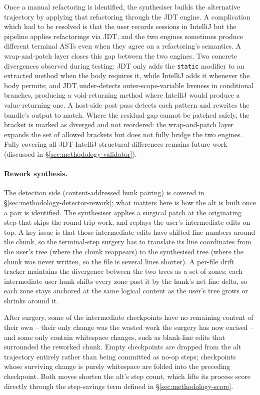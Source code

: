 Once a manual refactoring is identified, the synthesiser builds the alternative trajectory by applying that refactoring through the JDT engine. A complication which had to be resolved is that the user records sessions in IntelliJ but the pipeline applies refactorings via JDT, and the two engines sometimes produce different terminal ASTs even when they agree on a refactoring's semantics. A wrap-and-patch layer closes this gap between the two engines. Two concrete divergences observed during testing: JDT only adds the \texttt{static} modifier to an extracted method when the body requires it, while IntelliJ adds it whenever the body permits; and JDT under-detects outer-scope-variable liveness in conditional branches, producing a void-returning method where IntelliJ would produce a value-returning one. A host-side post-pass detects each pattern and rewrites the bundle's output to match. Where the residual gap cannot be patched safely, the bracket is marked as diverged and not reordered: the wrap-and-patch layer expands the set of allowed brackets but does not fully bridge the two engines. Fully covering all JDT-IntelliJ structural differences remains future work (discussed in \S\ref{sec:methodology-validator}).

\paragraph{Rework synthesis.}
The detection side (content-addressed hunk pairing) is covered in \S\ref{sec:methodology-detector-rework}; what matters here is how the alt is built once a pair is identified. The synthesiser applies a surgical patch at the originating step that skips the round-trip work, and replays the user's intermediate edits on top. A key issue is that those intermediate edits have shifted line numbers around the chunk, so the terminal-step surgery has to translate its line coordinates from the user's tree (where the chunk reappears) to the synthesised tree (where the chunk was never written, so the file is several lines shorter). A per-file drift tracker maintains the divergence between the two trees as a set of zones; each intermediate user hunk shifts every zone past it by the hunk's net line delta, so each zone stays anchored at the same logical content as the user's tree grows or shrinks around it.

After surgery, some of the intermediate checkpoints have no remaining content of their own -- their only change was the wasted work the surgery has now excised -- and some only contain whitespace changes, such as blank-line edits that surrounded the reworked chunk. Empty checkpoints are dropped from the alt trajectory entirely rather than being committed as no-op steps; checkpoints whose surviving change is purely whitespace are folded into the preceding checkpoint. Both moves shorten the alt's step count, which lifts its process score directly through the step-savings term defined in \S\ref{sec:methodology-score}.

